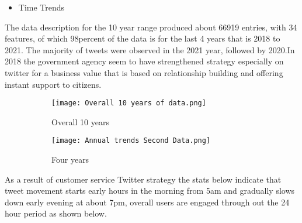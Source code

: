 \begin{itemize}
    \item Time Trends
\end{itemize}

The data description for the 10 year range produced about 66919 entries, with 34 features,  of which 98percent of the data  is for the last 4 years that is 2018 to 2021.  The majority of tweets were observed in the 2021 year, followed by 2020.In 2018 the government agency seem to have strengthened strategy especially on twitter for a business value that is based on relationship building and offering instant support to citizens.\\

\begin{figure}
      \centering
	    \begin{subfigure}{0.3\linewidth}
		\texttt{[image: Overall 10 years of data.png]}
		\caption{Overall 10 years}
		\label{fig: 10 year data distribution}
	   \end{subfigure}
	   \begin{subfigure}{0.3\linewidth}
		\texttt{[image: Annual trends Second Data.png]}
		\caption{Four years}
		\label{fig:Four years}
	    \end{subfigure}
	   \vfill
	 \caption{}
\end{figure}

As a result of customer service Twitter strategy the stats below indicate that tweet movement starts early hours in the morning from 5am and gradually slows down early evening at about 7pm, overall users are engaged through out the 24 hour period as shown below.  

